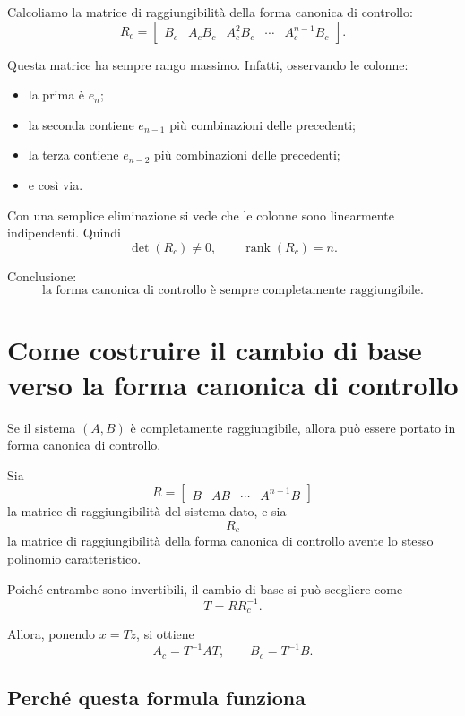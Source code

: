 Calcoliamo la matrice di raggiungibilità della forma canonica di controllo:
\[
R_c=
\begin{bmatrix}
B_c & A_cB_c & A_c^2B_c & \cdots & A_c^{n-1}B_c
\end{bmatrix}.
\]

Questa matrice ha sempre rango massimo.  
Infatti, osservando le colonne:
\begin{itemize}
    \item la prima è \(e_n\);
    \item la seconda contiene \(e_{n-1}\) più combinazioni delle precedenti;
    \item la terza contiene \(e_{n-2}\) più combinazioni delle precedenti;
    \item e così via.
\end{itemize}

Con una semplice eliminazione si vede che le colonne sono linearmente indipendenti. Quindi
\[
\det(R_c)\neq 0,
\qquad
\operatorname{rank}(R_c)=n.
\]

Conclusione:
\[
\boxed{\text{la forma canonica di controllo è sempre completamente raggiungibile.}}
\]

\section{Come costruire il cambio di base verso la forma canonica di controllo}

Se il sistema \((A,B)\) è completamente raggiungibile, allora può essere portato in forma canonica di controllo.

Sia
\[
R=\begin{bmatrix}B & AB & \cdots & A^{n-1}B\end{bmatrix}
\]
la matrice di raggiungibilità del sistema dato, e sia
\[
R_c
\]
la matrice di raggiungibilità della forma canonica di controllo avente lo stesso polinomio caratteristico.

Poiché entrambe sono invertibili, il cambio di base si può scegliere come
\begin{equation}
T=RR_c^{-1}.
\label{eq:L14_T_RRc}
\end{equation}

Allora, ponendo \(x=Tz\), si ottiene
\[
A_c=T^{-1}AT,\qquad
B_c=T^{-1}B.
\]

\subsection{Perché questa formula funziona}

